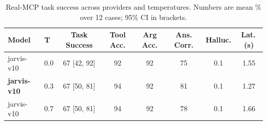 \begin{table}[t]
\centering
\small
\caption{Real-MCP task success across providers and temperatures. Numbers are mean \% over 12 cases; 95\% CI in brackets.}
\label{tab:mcp_bench}
\begin{tabular}{llcccccc}
\toprule
Model & T & Task Success & Tool Acc. & Arg Acc. & Ans. Corr. & Halluc. & Lat.\,(s) \\
\midrule
jarvis-v10 & 0.0 & 67 [42, 92] & 92 & 92 & 75 & 0.1 & 1.55 \\
\textbf{jarvis-v10} & 0.3 & 67 [50, 81] & 94 & 92 & 81 & 0.1 & 1.27 \\
jarvis-v10 & 0.7 & 67 [50, 81] & 94 & 92 & 78 & 0.1 & 1.66 \\
\bottomrule
\end{tabular}
\end{table}